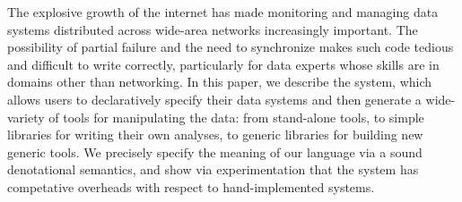 The explosive growth of the internet has made monitoring and managing
data systems distributed across wide-area networks increasingly
important.  The possibility of partial failure and the need to
synchronize makes such code tedious and difficult to write correctly,
particularly for data experts whose skills are in domains other than
networking. In this paper, we describe the \padsd{} system, which
allows users to declaratively specify their data systems and then
generate a wide-variety of tools for manipulating the data: from
stand-alone tools, to simple libraries for writing their own analyses,
to generic libraries for building new generic tools.  We precisely
specify the meaning of our language via a sound denotational
semantics, and show via experimentation that the system has
competative overheads with respect to hand-implemented systems.
